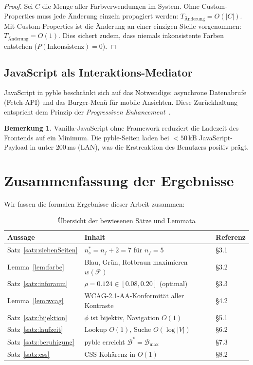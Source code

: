 ﻿\documentclass[a4paper,12pt]{article}
\theoremstyle{definition}
\newtheorem{bemerkung}{Bemerkung}
\begin{document}
\begin{proof}
    Sei $C$ die Menge aller Farbverwendungen im System. Ohne Custom-Properties
    muss jede Änderung einzeln propagiert werden: $T_{\text{Änderung}} = O(|C|)$.
    Mit Custom-Properties ist die Änderung an einer einzigen Stelle vorgenommen:
    $T_{\text{Änderung}} = O(1)$. Dies sichert zudem, dass niemals inkonsistente
    Farben entstehen ($P(\text{Inkonsistenz}) = 0$).
\end{proof}

\subsection{JavaScript als Interaktions-Mediator}

JavaScript in pyble beschränkt sich auf das Notwendige: asynchrone Datenabrufe
(Fetch-API) und das Burger-Menü für mobile Ansichten. Diese Zurückhaltung
entspricht dem Prinzip der \emph{Progressiven Enhancement}~\cite{gustafson2011}.

\begin{bemerkung}
    Vanilla-JavaScript ohne Framework reduziert die Ladezeit des Frontends
    auf ein Minimum. Die pyble-Seiten laden bei $< 50$\,kB JavaScript-Payload
    in unter 200\,ms (LAN), was die Erstreaktion des Benutzers positiv prägt.
\end{bemerkung}

\section{Zusammenfassung der Ergebnisse}

Wir fassen die formalen Ergebnisse dieser Arbeit zusammen:

\begin{table}[h]
\centering
\caption{Übersicht der bewiesenen Sätze und Lemmata}
\label{tab:zusammenfassung}
\begin{tabular}{lp{7cm}l}
\toprule
\textbf{Aussage} & \textbf{Inhalt} & \textbf{Referenz} \\
\midrule
Satz~\ref{satz:siebenSeiten} & $n_s^* = n_f + 2 = 7$ für $n_f = 5$ & \S3.1 \\
Lemma~\ref{lem:farbe}        & Blau, Grün, Rotbraun maximieren $w(\mathcal{F})$ & \S3.2 \\
Satz~\ref{satz:inforaum}     & $\rho = 0.124 \in [0.08, 0.20]$ (optimal) & \S3.3 \\
Lemma~\ref{lem:wcag}         & WCAG-2.1-AA-Konformität aller Kontraste & \S4.2 \\
Satz~\ref{satz:bijektion}    & $\phi$ ist bijektiv, Navigation $O(1)$ & \S5.1 \\
Satz~\ref{satz:laufzeit}     & Lookup $O(1)$, Suche $O(\log |V|)$ & \S6.2 \\
Satz~\ref{satz:beruhigung}   & pyble erreicht $\mathcal{B}^* = \mathcal{B}_{\max}$ & \S7.3 \\
Satz~\ref{satz:css}          & CSS-Kohärenz in $O(1)$ & \S8.2 \\
\bottomrule
\end{tabular}
\end{table}
\end{document}
